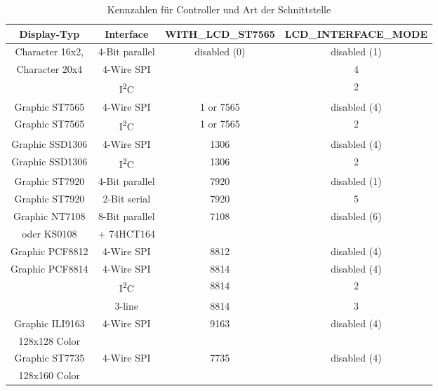 \begin{description}
\begin{table}[H]
  \begin{center}
    \begin{tabular}{| c | c | c | c|}
    \hline
 Display-Typ        &  Interface     & WITH\_LCD\_ST7565 &  LCD\_INTERFACE\_MODE \\
    \hline
    \hline
  Character 16x2,   & 4-Bit parallel &  disabled (0)      & disabled (1) \\
  Character 20x4    & 4-Wire SPI     &                    &    4   \\
                  & I\textsuperscript{2}C &               &    2   \\
    \hline
  Graphic ST7565    & 4-Wire SPI      & 1 or 7565          & disabled (4) \\
    \hline
  Graphic ST7565  & I\textsuperscript{2}C & 1 or 7565     &   2 \\
    \hline
  Graphic SSD1306   & 4-Wire SPI      & 1306               & disabled (4) \\
    \hline
  Graphic SSD1306 & I\textsuperscript{2}C & 1306          &   2 \\
    \hline
  Graphic ST7920    & 4-Bit parallel  & 7920              & disabled (1) \\
    \hline
  Graphic ST7920    & 2-Bit serial    & 7920               &  5 \\
    \hline
  Graphic NT7108    & 8-Bit parallel  & 7108              & disabled (6) \\
  oder KS0108       &    + 74HCT164   &                   &      \\
    \hline
  Graphic PCF8812   & 4-Wire SPI      & 8812              & disabled (4) \\
    \hline
  Graphic PCF8814   & 4-Wire SPI      & 8814              & disabled (4) \\
                  & I\textsuperscript{2}C & 8814          &   2 \\
                    & 3-line          & 8814              &   3 \\
    \hline
  Graphic ILI9163   & 4-Wire SPI      & 9163              & disabled (4) \\
  128x128 Color     &                 &                   &              \\
    \hline
  Graphic ST7735    & 4-Wire SPI      & 7735              & disabled (4) \\
  128x160 Color     &                 &                   &              \\
    \hline
    \end{tabular}
  \end{center}
  \caption{Kennzahlen für Controller und  Art der Schnittstelle}
  \label{tab:cod-display}
\end{table}


\end{description}
